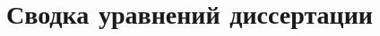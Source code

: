 \documentclass[a4paper,14pt,oneside,openany]{memoir}
\begin{document}
\gappto\captionsrussian{}

\gappto\captionsrussian{}



\chapter{Сводка уравнений диссертации}\label{ch:AllEquations}


\end{document}
